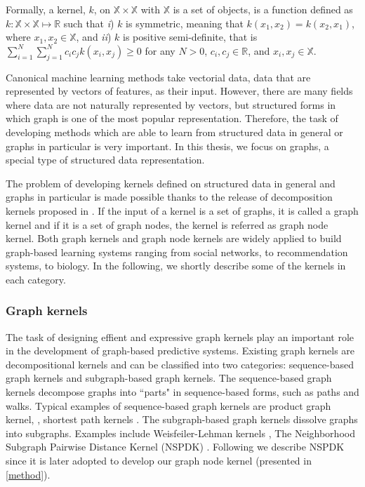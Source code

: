 \documentclass[review]{elsarticle}
\begin{document}
Formally, a kernel, $k$, on $\mathbb{X} \times \mathbb{X}$ with $\mathbb{X}$ is a set of objects, is a function defined as $k: \mathbb{X} \times \mathbb{X}\longmapsto \mathbb{R}$ such that \textit{i}) $k$ is symmetric, meaning that $k(x_1,x_2) = k(x_2,x_1)$, where $x_1, x_2 \in \mathbb{X}$, and \textit{ii}) $k$ is positive semi-definite, that is $\sum_{i=1}^{N}\sum_{j=1}^{N} c_i c_jk(x_i,x_j) \geq 0$ for any $N>0$, $c_i, c_j \in \mathbb{R}$, and  $x_i, x_j \in \mathbb{X}$. 

Canonical machine learning methods take vectorial data, data that are represented by vectors of features, as their input. However, there are many fields where data are not naturally represented by vectors, but structured forms in which graph is one of the most popular representation. Therefore, the task of developing methods which are able to learn from structured data in general or graphs in particular is very important. In this thesis, we focus on graphs, a special type of structured data representation.

The problem of developing kernels defined on structured data in general and graphs in particular is made possible thanks to the release of decomposition kernels proposed in \cite{haussler1999convolution}. If the input of a kernel is a set of graphs, it is called a graph kernel and if it is a set of graph nodes, the kernel is referred as graph node kernel. Both graph kernels and graph node kernels are widely applied to build graph-based learning systems ranging from social networks, to recommendation systems, to biology. In the following, we shortly describe some of the kernels in each category.

\subsubsection{Graph kernels}
\label{graph-kernels}
The task of designing effient and expressive graph kernels play an important role in the development of graph-based predictive systems. Existing graph kernels are decompositional kernels and can be classified into two categories: sequence-based graph kernels and subgraph-based graph kernels. The sequence-based graph kernels decompose graphs into ``parts" in sequence-based forms, such as paths and walks. Typical examples of sequence-based graph kernels are product graph kernel, \cite{gartner2003survey}, shortest path kernels \cite{borgwardt2005shortest}. The subgraph-based graph kernels dissolve graphs into subgraphs. Examples include Weisfeiler-Lehman kernels \cite{shervashidze2009fast, shervashidze2011weisfeiler}, The Neighborhood Subgraph Pairwise Distance Kernel (NSPDK) \cite{costa2010fast}. Following we describe NSPDK since it is later adopted to develop our graph node kernel (presented in \ref{method}).
\end{document}
